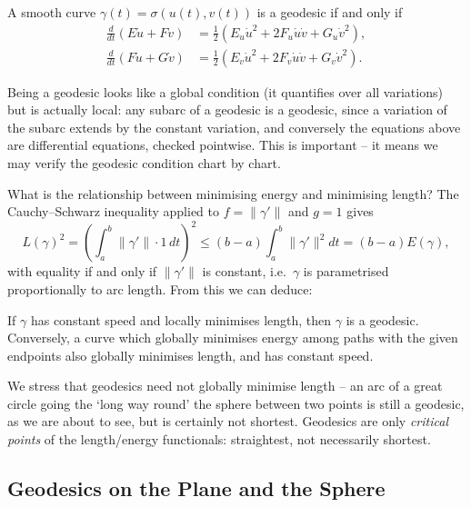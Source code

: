 \documentclass[a4paper]{scrartcl}
\begin{document}
\begin{corollary}
    A smooth curve $\gamma(t) = \sigma(u(t), v(t))$ is a geodesic if and only if
    \begin{align*}
        \frac{d}{dt}\left(E \dot u + F \dot v\right) &= \frac{1}{2}\left(E_u \dot u^2 + 2F_u \dot u \dot v + G_u \dot v^2\right), \\
        \frac{d}{dt}\left(F \dot u + G \dot v\right) &= \frac{1}{2}\left(E_v \dot u^2 + 2 F_v \dot u \dot v + G_v \dot v^2\right).
    \end{align*}
\end{corollary}

\begin{remark}
    Being a geodesic looks like a global condition (it quantifies over all variations) but is actually local: any subarc of a geodesic is a geodesic, since a variation of the subarc extends by the constant variation, and conversely the equations above are differential equations, checked pointwise. This is important -- it means we may verify the geodesic condition chart by chart.
\end{remark}

What is the relationship between minimising energy and minimising length? The Cauchy--Schwarz inequality applied to $f = \|\gamma'\|$ and $g = 1$ gives
$$
L(\gamma)^2 = \left(\int_a^b \|\gamma'\| \cdot 1 \, dt\right)^2 \leq (b - a)\int_a^b \|\gamma'\|^2 dt = (b - a) E(\gamma),
$$
with equality if and only if $\|\gamma'\|$ is constant, i.e.\ $\gamma$ is parametrised proportionally to arc length. From this we can deduce:

\begin{corollary}
    If $\gamma$ has constant speed and locally minimises length, then $\gamma$ is a geodesic. Conversely, a curve which globally minimises energy among paths with the given endpoints also globally minimises length, and has constant speed.
\end{corollary}

We stress that geodesics need not globally minimise length -- an arc of a great circle going the `long way round' the sphere between two points is still a geodesic, as we are about to see, but is certainly not shortest. Geodesics are only \emph{critical points} of the length/energy functionals: straightest, not necessarily shortest.

\subsection{Geodesics on the Plane and the Sphere}
\end{document}
